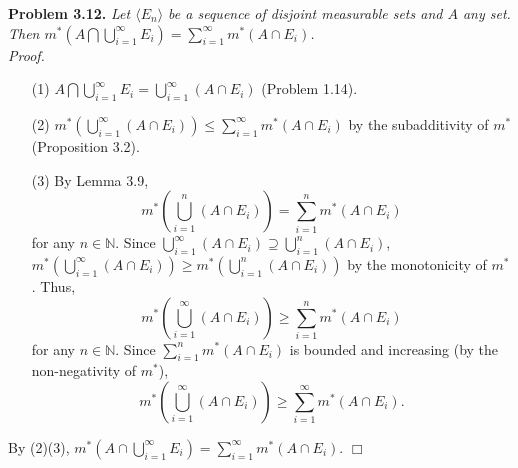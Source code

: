 \documentclass{article}
\begin{document}



\textbf{Problem 3.12.}
\emph{Let $\langle E_n \rangle$ be a sequence of disjoint measurable sets and $A$ any set.
Then
$m^{*}\left( A \bigcap \bigcup_{i=1}^{\infty}E_i \right)
= \sum_{i=1}^{\infty} m^{*}(A \cap E_i)$.} \\



\emph{Proof.}
\begin{enumerate}
\item[(1)]
  $A \bigcap \bigcup_{i=1}^{\infty}E_i
  = \bigcup_{i=1}^{\infty}(A \cap E_i)$ (Problem 1.14).

\item[(2)]
  $m^{*}\left( \bigcup_{i=1}^{\infty}(A \cap E_i) \right)
  \leq \sum_{i=1}^{\infty} m^{*}(A \cap E_i)$
  by the subadditivity of $m^{*}$ (Proposition 3.2).

\item[(3)]
  By Lemma 3.9,
  $$m^{*}\left( \bigcup_{i=1}^{n}(A \cap E_i) \right)
  = \sum_{i=1}^{n} m^{*}(A \cap E_i)$$
  for any $n \in \mathbb{N}$.
  Since
  $\bigcup_{i=1}^{\infty}(A \cap E_i) \supseteq \bigcup_{i=1}^{n}(A \cap E_i)$,
  $m^{*}\left( \bigcup_{i=1}^{\infty}(A \cap E_i) \right)
  \geq m^{*}\left( \bigcup_{i=1}^{n}(A \cap E_i) \right)$ by the monotonicity of $m^{*}$.
  Thus,
  \[
    m^{*}\left( \bigcup_{i=1}^{\infty}(A \cap E_i) \right)
    \geq
    \sum_{i=1}^{n} m^{*}(A \cap E_i)
  \]
  for any $n \in \mathbb{N}$.
  Since $\sum_{i=1}^{n} m^{*}(A \cap E_i)$ is bounded and increasing
  (by the non-negativity of $m^{*}$),
  \[
    m^{*}\left( \bigcup_{i=1}^{\infty}(A \cap E_i) \right)
    \geq
    \sum_{i=1}^{\infty} m^{*}(A \cap E_i).
  \]
\end{enumerate}
By (2)(3),
$m^{*}\left( A \cap \bigcup_{i=1}^{\infty}E_i \right)
= \sum_{i=1}^{\infty} m^{*}(A \cap E_i)$.
$\Box$ \\\\



\end{document}
